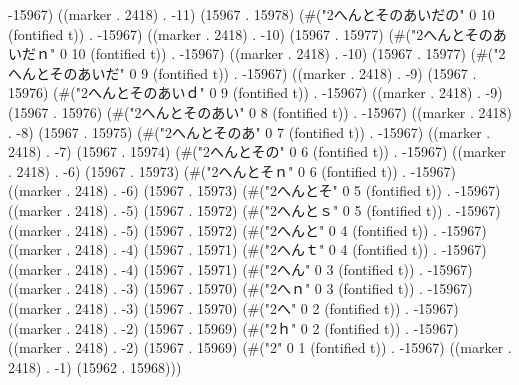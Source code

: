 -15967) ((marker . 2418) . -11) (15967 . 15978) (#("2へんとそのあいだの" 0 10 (fontified t)) . -15967) ((marker . 2418) . -10) (15967 . 15977) (#("2へんとそのあいだｎ" 0 10 (fontified t)) . -15967) ((marker . 2418) . -10) (15967 . 15977) (#("2へんとそのあいだ" 0 9 (fontified t)) . -15967) ((marker . 2418) . -9) (15967 . 15976) (#("2へんとそのあいｄ" 0 9 (fontified t)) . -15967) ((marker . 2418) . -9) (15967 . 15976) (#("2へんとそのあい" 0 8 (fontified t)) . -15967) ((marker . 2418) . -8) (15967 . 15975) (#("2へんとそのあ" 0 7 (fontified t)) . -15967) ((marker . 2418) . -7) (15967 . 15974) (#("2へんとその" 0 6 (fontified t)) . -15967) ((marker . 2418) . -6) (15967 . 15973) (#("2へんとそｎ" 0 6 (fontified t)) . -15967) ((marker . 2418) . -6) (15967 . 15973) (#("2へんとそ" 0 5 (fontified t)) . -15967) ((marker . 2418) . -5) (15967 . 15972) (#("2へんとｓ" 0 5 (fontified t)) . -15967) ((marker . 2418) . -5) (15967 . 15972) (#("2へんと" 0 4 (fontified t)) . -15967) ((marker . 2418) . -4) (15967 . 15971) (#("2へんｔ" 0 4 (fontified t)) . -15967) ((marker . 2418) . -4) (15967 . 15971) (#("2へん" 0 3 (fontified t)) . -15967) ((marker . 2418) . -3) (15967 . 15970) (#("2へｎ" 0 3 (fontified t)) . -15967) ((marker . 2418) . -3) (15967 . 15970) (#("2へ" 0 2 (fontified t)) . -15967) ((marker . 2418) . -2) (15967 . 15969) (#("2ｈ" 0 2 (fontified t)) . -15967) ((marker . 2418) . -2) (15967 . 15969) (#("2" 0 1 (fontified t)) . -15967) ((marker . 2418) . -1) (15962 . 15968)))
